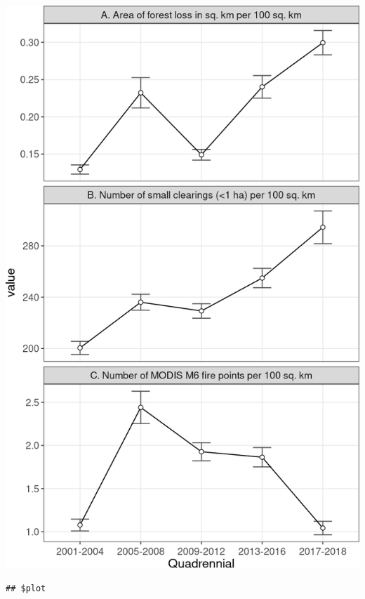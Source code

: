 \documentclass[10pt,landscape,a3paper]{article}
\begin{document}
\begin{center}\includegraphics{img/modelling/aa-eda-ts-12} \end{center}

\begin{verbatim}
## $plot
\end{verbatim}
\end{document}
